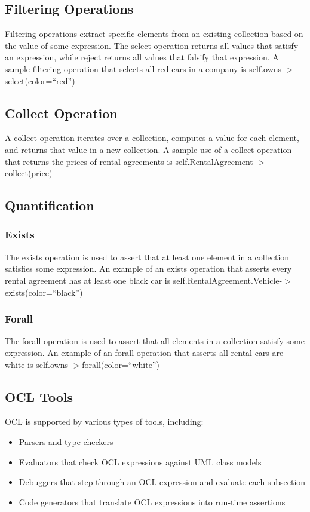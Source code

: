 \documentclass[12pt,titlepage]{article}
\begin{document}
    \subsection{Filtering Operations}
      Filtering operations extract specific elements from an existing collection based on the value of some expression. The select operation
      returns all values that satisfy an expression, while reject returns all values that falsify that expression. A sample filtering operation
      that selects all red cars in a company is self.owns-$>$select(color=``red'')

    \subsection{Collect Operation}
      A collect operation iterates over a collection, computes a value for each element, and returns that value in a new collection. A sample
      use of a collect operation that returns the prices of rental agreements is self.RentalAgreement-$>$collect(price)

    \subsection{Quantification}

      \subsubsection{Exists}
        The exists operation is used to assert that at least one element in a collection satisfies some expression. An example of an exists
        operation that asserts every rental agreement has at least one black car is self.RentalAgreement.Vehicle-$>$exists(color=``black'')

      \subsubsection{Forall}
        The forall operation is used to assert that all elements in a collection satisfy some expression. An example of an forall operation
        that asserts all rental cars are white is self.owns-$>$forall(color=``white'')

    \subsection{OCL Tools}
      OCL is supported by various types of tools, including:
      \begin{itemize}
        \item Parsers and type checkers
        \item Evaluators that check OCL expressions against UML class models
        \item Debuggers that step through an OCL expression and evaluate each subsection
        \item Code generators that translate OCL expressions into run-time assertions
      \end{itemize}
\end{document}

